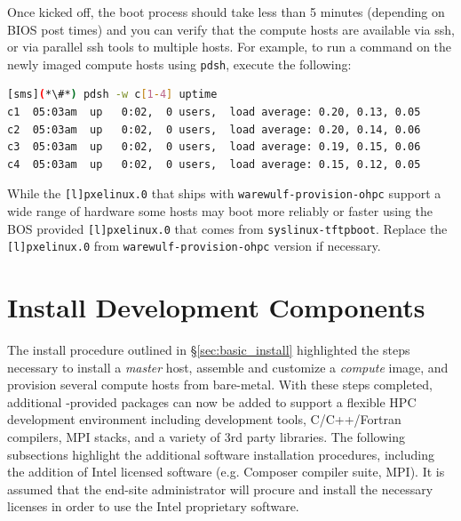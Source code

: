 \documentclass[letterpaper]{article}
\begin{document}
Once kicked off, the boot process should take less than 5 minutes (depending on
BIOS post times) and you can verify that the compute hosts are available via
ssh, or via parallel ssh tools to multiple hosts. For example, to run a command
on the newly imaged compute hosts using \texttt{pdsh}, execute the following:

\begin{lstlisting}[language=bash]
[sms](*\#*) pdsh -w c[1-4] uptime
c1  05:03am  up   0:02,  0 users,  load average: 0.20, 0.13, 0.05
c2  05:03am  up   0:02,  0 users,  load average: 0.20, 0.14, 0.06
c3  05:03am  up   0:02,  0 users,  load average: 0.19, 0.15, 0.06
c4  05:03am  up   0:02,  0 users,  load average: 0.15, 0.12, 0.05
\end{lstlisting}

\begin{center}
\begin{tcolorbox}[]
\small
While the \texttt{[l]pxelinux.0} that ships with \texttt{warewulf-provision-ohpc}
support a wide range of hardware some hosts may boot more reliably or faster
using the BOS provided \texttt{[l]pxelinux.0} that comes from
\texttt{syslinux-tftpboot}. Replace the \texttt{[l]pxelinux.0} from 
\texttt{warewulf-provision-ohpc} version if necessary.
\end{tcolorbox}
\end{center}

\section{Install \OHPC{} Development Components}

The install procedure outlined in \S\ref{sec:basic_install}
highlighted the steps necessary to install a {\em master} host,
assemble and customize a {\em compute} image, and provision several
compute hosts from bare-metal. With these steps completed, 
additional \OHPC{}-provided packages can now be added to support a flexible HPC
development environment including development tools, C/C++/Fortran compilers,
MPI stacks, and a variety of 3rd party libraries. The following subsections
highlight the additional software installation procedures, including the
addition of Intel licensed software (e.g. Composer compiler suite, \Intel{}
MPI). It is assumed that the end-site administrator will procure and install
the necessary licenses in order to use the Intel proprietary software.
\end{document}
